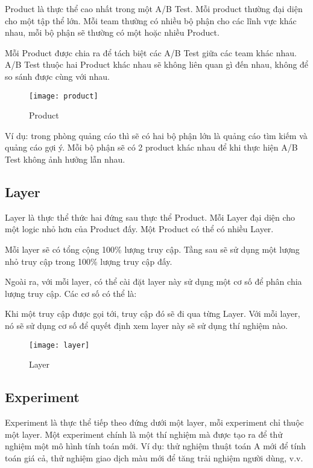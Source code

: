 Product là thực thể cao nhất trong một A/B Test. Mỗi product thường đại diện cho một tập thể lớn. Mỗi team thường có nhiều bộ phận cho các lĩnh vực khác nhau, mỗi bộ phận sẽ thường có một hoặc nhiều Product.

Mỗi Product được chia ra để tách biệt các A/B Test giữa các team khác nhau. A/B Test thuộc hai Product khác nhau sẽ không liên quan gì đến nhau, không để so sánh được cùng với nhau.

\begin{figure}[H]
	\centering
	\texttt{[image: product]}
	\caption{Product}
\end{figure}

Ví dụ: trong phòng quảng cáo thì sẽ có hai bộ phận lớn là quảng cáo tìm kiếm và quảng cáo gợi ý. Mỗi bộ phận sẽ có 2 product khác nhau để khi thực hiện A/B Test không ảnh hưởng lẫn nhau.

\subsection{Layer}

Layer là thực thể thức hai đứng sau thực thể Product. Mỗi Layer đại diện cho một logic nhỏ hơn của Product đấy. Một Product có thể có nhiều Layer.

Mỗi layer sẽ có tổng cộng 100\% lượng truy cập. Tầng sau sẽ sử dụng một lượng nhỏ truy cập trong 100\% lượng truy cập đấy.

Ngoài ra, với mỗi layer, có thể cài đặt layer này sử dụng một cơ số để phân chia lượng truy cập. Các cơ số có thể là:

\begin{itemize}
\end{itemize}

Khi một truy cập được gọi tới, truy cập đó sẽ đi qua từng Layer. Với mỗi layer, nó sẽ sử dụng cơ số để quyết định xem layer này sẽ sử dụng thí nghiệm nào.

\begin{figure}[H]
	\centering
	\texttt{[image: layer]}
	\caption{Layer}
\end{figure}

\subsection{Experiment}

Experiment là thực thể tiếp theo đứng dưới một layer, mỗi experiment chỉ thuộc một layer. Một experiment chính là một thí nghiệm mà được tạo ra để thử nghiệm một mô hình tính toán mới. Ví dụ: thử nghiệm thuật toán A mới để tính toán giá cả, thử nghiệm giao dịch màu mới để tăng trải nghiệm người dùng, v.v.

